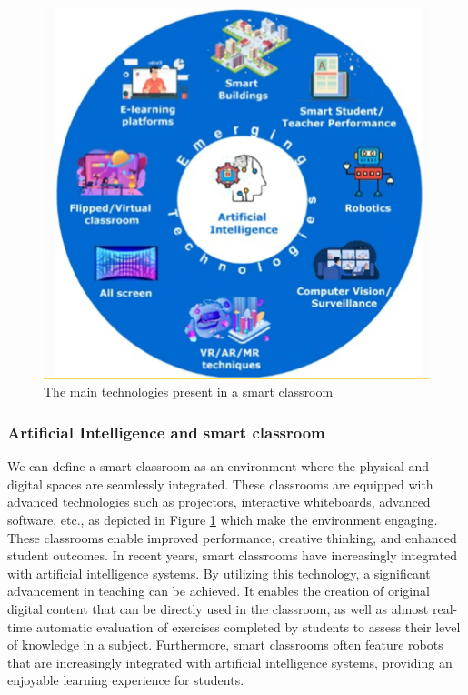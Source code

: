 \documentclass[a4paper,12pt]{article}
\begin{document}
\begin{figure}
    \centering
    \includegraphics[scale=0.5]{figure2.png}
    \caption{The main technologies present in a smart classroom \cite{dimitriadou2023critical}}
    \label{fig:enter-label2}
\end{figure} 

\subsubsection{Artificial Intelligence and smart classroom}
We can define a smart classroom as an environment where the physical and digital spaces are seamlessly integrated. These classrooms are equipped with advanced technologies such as projectors, interactive whiteboards, advanced software, etc., as depicted in Figure \ref{fig:enter-label2} which make the environment engaging. These classrooms enable improved performance, creative thinking, and enhanced student outcomes.
In recent years, smart classrooms have increasingly integrated with artificial intelligence systems. By utilizing this technology, a significant advancement in teaching can be achieved. It enables the creation of original digital content that can be directly used in the classroom, as well as almost real-time automatic evaluation of exercises completed by students to assess their level of knowledge in a subject.
Furthermore, smart classrooms often feature robots that are increasingly integrated with artificial intelligence systems, providing an enjoyable learning experience for students.
\end{document}
